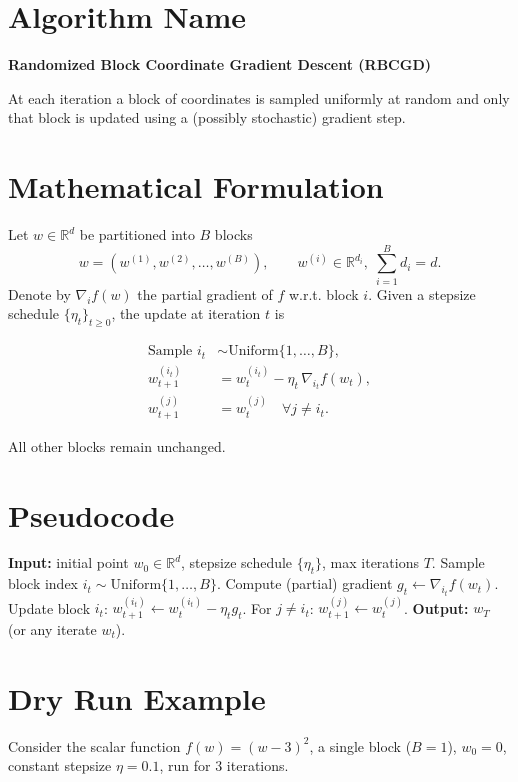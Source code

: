 \documentclass{article}
\newcommand{\R}{\mathbb{R}}
\begin{document}
\section*{Algorithm Name}
\textbf{Randomized Block Coordinate Gradient Descent (RBCGD)}  

At each iteration a block of coordinates is sampled uniformly at random and only that block is updated using a (possibly stochastic) gradient step.

\section*{Mathematical Formulation}
Let $w\in\R^{d}$ be partitioned into $B$ blocks 
\[
w=(w^{(1)},w^{(2)},\dots ,w^{(B)}),\qquad 
w^{(i)}\in\R^{d_i},\; \sum_{i=1}^{B}d_i=d .
\]
Denote by $\nabla_{i} f(w)$ the partial gradient of $f$ w.r.t. block $i$.  
Given a stepsize schedule $\{\eta_t\}_{t\ge 0}$, the update at iteration $t$ is

\[
\boxed{\;
\begin{aligned}
\text{Sample } i_t &\sim \text{Uniform}\{1,\dots ,B\},\\[0.2em]
w_{t+1}^{(i_t)} &= w_{t}^{(i_t)} - \eta_t \,\nabla_{i_t} f(w_t),\\
w_{t+1}^{(j)} &= w_{t}^{(j)}\quad\forall j\neq i_t .
\end{aligned}
\;}
\tag{1}
\]

All other blocks remain unchanged.

\section*{Pseudocode}
\begin{algorithm}[H]
\caption{Randomized Block Coordinate Gradient Descent}
\begin{algorithmic}[1]
\STATE \textbf{Input:} initial point $w_0\in\R^{d}$, stepsize schedule $\{\eta_t\}$, max iterations $T$.
    \STATE Sample block index $i_t\sim\text{Uniform}\{1,\dots ,B\}$.
    \STATE Compute (partial) gradient $g_t \gets \nabla_{i_t} f(w_t)$.
    \STATE Update block $i_t$: $w_{t+1}^{(i_t)} \gets w_{t}^{(i_t)} - \eta_t g_t$.
    \STATE For $j\neq i_t$: $w_{t+1}^{(j)} \gets w_{t}^{(j)}$.
\ENDFOR
\STATE \textbf{Output:} $w_T$ (or any iterate $w_t$).
\end{algorithmic}
\end{algorithm}

\section*{Dry Run Example}
Consider the scalar function $f(w)=(w-3)^2$, a single block ($B=1$), $w_0=0$, constant stepsize $\eta=0.1$, run for $3$ iterations.
\end{document}
